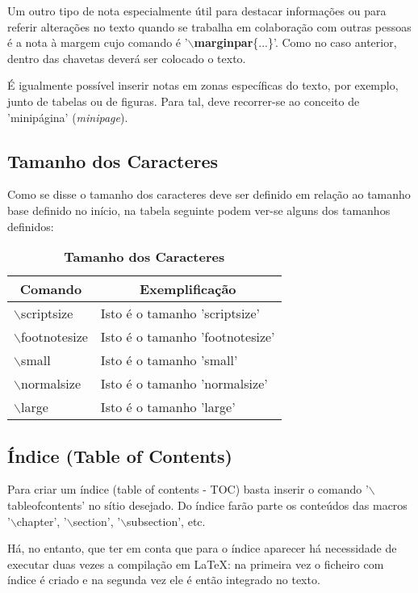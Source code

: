 \documentclass[a4paper,12pt]{article}
\begin{document}
Um outro tipo de nota especialmente útil para destacar 
informações ou para referir alterações no texto
quando se trabalha em colaboração com outras pessoas 
é a nota à margem cujo comando é
'$\backslash${\bf marginpar}\{...\}'. Como no caso anterior,
dentro das chavetas deverá ser colocado o 
texto. 

É igualmente possível inserir notas em zonas específicas do
texto, por exemplo, junto de tabelas ou de figuras. Para tal,
deve recorrer-se ao conceito de 'minipágina' 
({\it minipage}).

\subsection{Tamanho dos Caracteres}

Como se disse o tamanho dos caracteres deve ser definido em 
relação ao tamanho base definido no início, na tabela
seguinte podem ver-se alguns dos tamanhos definidos:

\begin{table}[h]
\label{TabSize}
\caption{\bf Tamanho dos Caracteres}
\begin{center}
\begin{tabular}{l|l} \hline
\multicolumn{1}{c|}{\bf Comando} & \multicolumn{1}{c}{\bf Exemplificação}  \\ \hline
$\backslash$scriptsize  & {\scriptsize Isto é o tamanho 'scriptsize'}   \\ \hline
$\backslash$footnotesize  & {\footnotesize Isto é o tamanho 'footnotesize'}   \\ \hline
$\backslash$small  & {\small Isto é o tamanho 'small'}   \\ \hline
$\backslash$normalsize  & {\normalsize Isto é o tamanho 'normalsize'}   \\ \hline
$\backslash$large  & {\large Isto é o tamanho 'large'}   \\ \hline
\end{tabular}
\end{center}
\end{table}

\subsection{Índice (Table of Contents)}

Para criar um índice (table of contents - TOC) basta
inserir o comando '$\backslash$tableofcontents' no sítio desejado.
Do índice farão parte os conteúdos das macros '$\backslash$chapter',
'$\backslash$section', '$\backslash$subsection', etc.
\par
Há, no entanto, que ter em conta que para o índice aparecer há
necessidade de executar duas vezes a compilação em \LaTeX:
na primeira vez o ficheiro com índice é criado e na segunda
vez ele é então integrado no texto.
\end{document}

